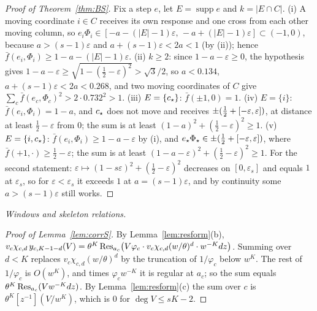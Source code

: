 \begin{proof}[Proof of Theorem~\ref{thm:BS}]
Fix a step $e$, let $E=\operatorname{supp}e$ and $k=|E\cap C|$. (i) A moving coordinate $i\in C$ receives its own response and one cross from each other moving column, so $e_i\Phi_i\in[-a-(|E|-1)\varepsilon,\,-a+(|E|-1)\varepsilon]\subset(-1,0)$, because $a>(s-1)\varepsilon$ and $a+(s-1)\varepsilon<2a<1$ (by (ii)); hence $\bar f(e_i,\Phi_i)\ge1-a-(|E|-1)\varepsilon$. (ii) $k\ge2$: since $1-a-\varepsilon\ge0$, the hypothesis gives $1-a-\varepsilon\ge\sqrt{1-(\frac12-\varepsilon)^2}>\sqrt3/2$, so $a<0.134$, $a+(s-1)\varepsilon<2a<0.268$, and two moving coordinates of $C$ give $\sum_c\bar f(e_c,\Phi_c)^2>2\cdot0.732^2>1$. (iii) $E=\{c_{\star}\}$: $\bar f(\pm1,0)=1$. (iv) $E=\{i\}$: $\bar f(e_i,\Phi_i)=1-a$, and $c_{\star}$ does not move and receives $\pm(\tfrac12+[-\varepsilon,\varepsilon])$, at distance at least $\frac12-\varepsilon$ from $0$; the sum is at least $(1-a)^2+(\frac12-\varepsilon)^2\ge1$. (v) $E=\{i,c_{\star}\}$: $\bar f(e_i,\Phi_i)\ge1-a-\varepsilon$ by (i), and $e_\star\Phi_\star\in\pm(\tfrac12+[-\varepsilon,\varepsilon])$, where $\bar f(+1,\cdot)\ge\frac12-\varepsilon$; the sum is at least $(1-a-\varepsilon)^2+(\frac12-\varepsilon)^2\ge1$. For the second statement: $\varepsilon\mapsto(1-s\varepsilon)^2+(\frac12-\varepsilon)^2$ decreases on $[0,\varepsilon_s]$ and equals $1$ at $\varepsilon_s$, so for $\varepsilon<\varepsilon_s$ it exceeds $1$ at $a=(s-1)\varepsilon$, and by continuity some $a>(s-1)\varepsilon$ still works.
\end{proof}



\emph{Windows and skeleton relations.}\label{app:jointproof}
\begin{proof}[Proof of Lemma~\ref{lem:corrS}]
By Lemma~\ref{lem:resform}(b), $v_c\chi_{c,d}\,y_{c,K-1-d}(V)=\theta^K\operatorname{Res}_{a_c}\bigl(V\varphi_c\cdot v_c\chi_{c,d}(w/\theta)^d\cdot w^{-K}dz\bigr)$. Summing over $d<K$ replaces $v_c\chi_{c,d}(w/\theta)^d$ by the truncation of $1/\varphi_c$ below $w^K$. The rest of $1/\varphi_c$ is $O(w^K)$, and times $\varphi_cw^{-K}$ it is regular at $a_c$; so the sum equals $\theta^K\operatorname{Res}_{a_c}(Vw^{-K}dz)$. By Lemma~\ref{lem:resform}(c) the sum over $c$ is $\theta^K[z^{-1}](V/w^K)$, which is $0$ for $\deg V\le sK-2$.
\end{proof}

